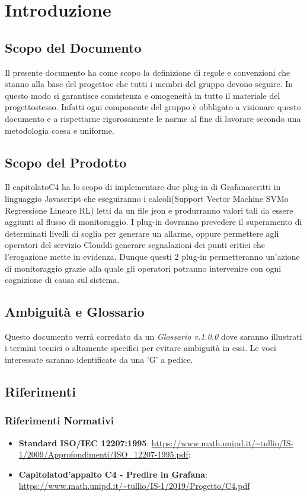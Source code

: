 \section{Introduzione}
\subsection{Scopo del Documento}
Il presente documento ha come scopo la definizione di regole e convenzioni che stanno alla base del progetto\glosp e che tutti i membri del gruppo devono seguire. In questo modo si garantisce consistenza e omogeneità in tutto il materiale del progetto\glosp stesso. Infatti ogni componente del gruppo è obbligato a visionare questo documento e a rispettarne rigorosamente le norme al fine di lavorare secondo una metodologia coesa e uniforme.
\subsection{Scopo del Prodotto}
Il capitolato\glosp C4 ha lo scopo di implementare due plug-in di Grafana\glosp scritti in linguaggio Javascript che eseguiranno i calcoli(Support Vector Machine SVM\glosp o Regressione Lineare RL\glo) letti da un file json e produrranno valori tali da essere aggiunti al flusso di monitoraggio. I plug-in dovranno prevedere il superamento di determinati livelli di soglia per generare un allarme, oppure permettere agli operatori del servizio Cloud\glosp di generare segnalazioni dei punti critici che l'erogazione mette in evidenza.
Dunque questi 2 plug-in permetteranno un'azione di monitoraggio grazie alla quale gli operatori potranno intervenire con ogni cognizione di causa sul sistema.
\subsection{Ambiguità e Glossario}
Questo documento verrà corredato da un \textit{Glossario v.1.0.0} dove saranno illustrati i termini tecnici o altamente specifici per evitare ambiguità in essi. Le voci interessate saranno identificate da una 'G' a pedice.
\subsection{Riferimenti}
\subsubsection{Riferimenti Normativi}
\begin{itemize}
	\item \textbf{Standard ISO/IEC 12207:1995}: 
	\url{https://www.math.unipd.it/~tullio/IS-1/2009/Approfondimenti/ISO_12207-1995.pdf};
	\item \textbf{Capitolato\glosp d'appalto C4 - Predire in Grafana}:  \url{https://www.math.unipd.it/~tullio/IS-1/2019/Progetto/C4.pdf}
\end{itemize}
